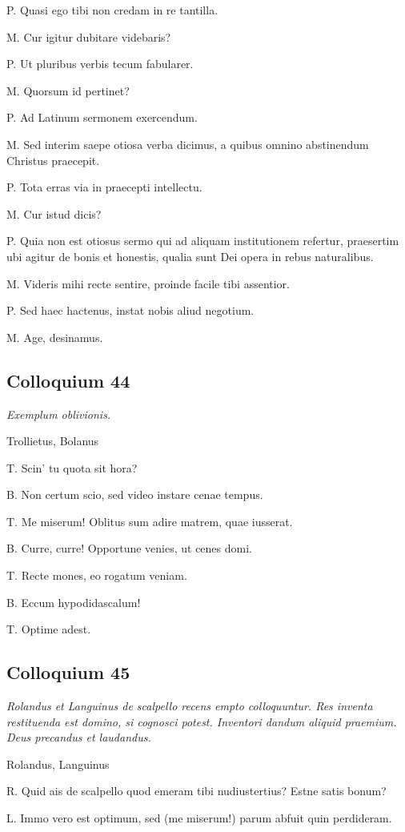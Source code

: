 \documentclass{article}
\begin{document}
P. Quasi ego tibi non credam in re tantilla. 

M. Cur igitur dubitare videbaris?

P. Ut pluribus verbis tecum fabularer. 

M. Quorsum id pertinet?

P. Ad Latinum sermonem exercendum. 

M. Sed interim saepe otiosa verba dicimus, a quibus omnino abstinendum Christus praecepit. 

P. Tota erras via in praecepti intellectu. 

M. Cur istud dicis?

P. Quia non est otiosus sermo qui ad aliquam institutionem refertur, praesertim ubi agitur de bonis et honestis, qualia sunt Dei opera in rebus naturalibus. 

M. Videris mihi recte sentire, proinde facile tibi assentior. 

P. Sed haec hactenus, instat nobis aliud negotium. 

M. Age, desinamus.

\subsection{Colloquium 44}
\emph{Exemplum oblivionis.}

Trollietus, Bolanus

T. Scin' tu quota sit hora?

B. Non certum scio, sed video instare cenae tempus. 

T. Me miserum! Oblitus sum adire matrem, quae iusserat. 

B. Curre, curre! Opportune venies, ut cenes domi. 

T. Recte mones, eo rogatum veniam. 

B. Eccum hypodidascalum!

T. Optime adest. 

\subsection{Colloquium 45}
\emph{Rolandus et Languinus de scalpello recens empto colloquuntur. Res inventa restituenda est domino, si cognosci potest. Inventori dandum aliquid praemium. Deus precandus et laudandus.}

Rolandus, Languinus

R. Quid ais de scalpello quod emeram tibi nudiustertius? Estne satis bonum?

L. Immo vero est optimum, sed (me miserum!) parum abfuit quin perdideram. 
\end{document}

